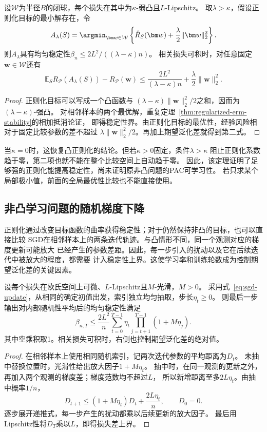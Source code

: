 \begin{theorem}[弱凸损失的正则化稳定性]
\label{thm:weakly-convex-regularization}
设$\mathcal W$为半径$B$的闭球，每个损失在其中为$\kappa$-弱凸且$L$-Lipschitz。
取$\lambda>\kappa$，假设正则化目标的最小解存在，令
\[
 A_\lambda(S)=\argmin_{\bm w\in\mathcal W}
 \left\{\hat R_S(\bm w)+\frac\lambda2\|\bm w\|_2^2\right\}.
\]
则$A_\lambda$具有均匀稳定性$\beta_n\leq2L^2/((\lambda-\kappa)n)$。
相关损失可积时，对任意固定$\bm w\in\mathcal W$还有
\[
 \mathbb E_S R_{\mathcal P}(A_\lambda(S))-R_{\mathcal P}(\bm w)
 \leq\frac{2L^2}{(\lambda-\kappa)n}+\frac\lambda2\|\bm w\|_2^2.
\]
\end{theorem}
\begin{proof}
正则化目标可以写成一个凸函数与
$(\lambda-\kappa)\|\bm w\|_2^2/2$之和，因而为$(\lambda-\kappa)$-强凸。
对相邻样本的两个最优解，重复定理~\ref{thm:regularized-erm-stability}的相加抵消论证，
即得稳定性界。由正则化目标的最优性，经验风险相对于固定比较参数的差不超过
$\lambda\|\bm w\|_2^2/2$。再加上期望泛化差就得到第二式。
\end{proof}

当$\kappa=0$时，这恢复凸正则化的结论。但若$\kappa>0$固定，条件$\lambda>\kappa$
阻止正则化系数趋于零，第二项也就不能在整个比较空间上自动趋于零。
因此，该定理证明了足够强的正则化能提高稳定性，尚未证明原非凸问题的PAC可学习性。
若只求某个局部极小值，前面的全局最优性比较也不能直接使用。

\subsection{非凸学习问题的随机梯度下降}

正则化通过改变目标函数的曲率获得稳定性；对于仍然保持非凸的目标，也可以直接比较
SGD在相邻样本上的两条迭代轨迹。与凸情形不同，同一个观测对应的梯度更新可能放大
已经产生的参数差距。因此，每一步引入的扰动以及它在后续迭代中被放大的程度，都需要
计入稳定性上界。这使学习率和训练轮数成为控制期望泛化差的关键因素。

\begin{theorem}[非凸SGD的扰动传播]
\label{thm:nonconvex-sgd-product}
设每个损失在欧氏空间上可微、$L$-Lipschitz且$M$-光滑，$M>0$。
采用式~\eqref{eq:sgd-update}，从相同的确定初值出发，索引独立均匀抽取，步长$\eta_t\geq0$。
则最后一步输出对内部随机性平均后的均匀稳定性满足
\[
 \beta_{n,T}\leq\frac{2L^2}{n}
 \sum_{t=0}^{T-1}\eta_t\prod_{j=t+1}^{T-1}(1+M\eta_j).
\]
其中空乘积取1。相关损失可积时，右侧也控制期望泛化差的绝对值。
\end{theorem}
\begin{proof}
在相邻样本上使用相同随机索引，记两次迭代参数的平均距离为$D_t$。
未抽中替换位置时，光滑性给出放大因子$1+M\eta_t$。
抽中时，在同一观测的更新之外，再加入两个观测的梯度差；梯度范数均不超过$L$，
所以新增距离至多$2L\eta_t$。由抽中概率$1/n$，
\[
 D_{t+1}\leq(1+M\eta_t)D_t+\frac{2L\eta_t}{n},\qquad D_0=0.
\]
逐步展开递推式，每一步产生的扰动都乘以后续更新的放大因子。
最后用Lipschitz性将$D_T$乘以$L$，即得损失差上界。
\end{proof}

